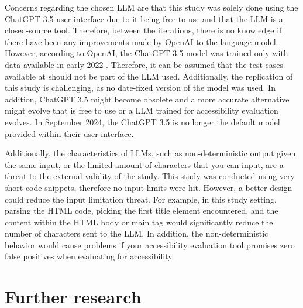 Concerns regarding the chosen LLM are that this study was solely done using the ChatGPT 3.5 user interface due to it being free to use and that the LLM is a closed-source tool. Therefore, between the iterations, there is no knowledge if there have been any improvements made by OpenAI to the language model. However, according to OpenAI, the ChatGPT 3.5 model was trained only with data available in early 2022 \citep{openai_35}. Therefore, it can be assumed that the test cases available at \textcite{act_rule_g88} should not be part of the LLM used. Additionally, the replication of this study is challenging, as no date-fixed version of the model was used. In addition, ChatGPT 3.5 might become obsolete and a more accurate alternative might evolve that is free to use or a LLM trained for accessibility evaluation evolves. In September 2024, the ChatGPT 3.5 is no longer the default model provided within their user interface.

Additionally, the characteristics of LLMs, such as non-deterministic output given the same input, or the limited amount of characters that you can input, are a threat to the external validity of the study. This study was conducted using very short code snippets, therefore no input limits were hit. However, a better design could reduce the input limitation threat. For example, in this study setting, parsing the HTML code, picking the first title element encountered, and the content within the HTML body or main tag would significantly reduce the number of characters sent to the LLM. In addition, the non-deterministic behavior would cause problems if your accessibility evaluation tool promises zero false positives when evaluating for accessibility.

\section{Further research}
